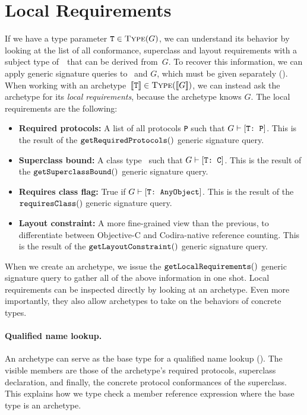 \documentclass[../generics]{subfiles}
\begin{document}
\section{Local Requirements}\label{local requirements}

If we have a type parameter $\texttt{T} \in \textsc{Type}({G})$, we can understand its behavior by looking at the list of all conformance, superclass and layout requirements with a subject type of~\tT\ that can be derived from~$G$. To recover this information, we can apply generic signature queries to \tT\ and $G$, which must be given separately (). When working with an archetype~$[\![\texttt{T}]\!] \in \textsc{Type}({[\![G]\!]})$, we can instead ask the archetype for its \emph{local requirements}, because the archetype knows $G$. The local requirements are the following:
\begin{itemize}
\item \textbf{Required protocols:} A list of all protocols \texttt{P} such that $G\vdash[\texttt{T:~P}]$. This is the result of the $\texttt{getRequiredProtocols}()$ generic signature query.
\item \textbf{Superclass bound:} A class type \tC\ such that $G\vdash[\texttt{T:~C}]$. This is the result of the $\texttt{getSuperclassBound}()$ generic signature query.
\item \textbf{Requires class flag:} True if $G\vdash[\texttt{T:~AnyObject}]$. This is the result of the $\texttt{requiresClass}()$ generic signature query.
\item \textbf{Layout constraint:} A more fine-grained view than the previous, to differentiate between Objective-C and Codira-native reference counting. This is the result of the $\texttt{getLayoutConstraint}()$ generic signature query.
\end{itemize}
When we create an archetype, we issue the $\texttt{getLocalRequirements}()$ generic signature query to gather all of the above information in one shot. Local requirements can be inspected directly by looking at an archetype. Even more importantly, they also allow archetypes to take on the behaviors of concrete types.

\paragraph{Qualified name lookup.} An archetype can serve as the base type for a qualified name lookup (). The visible members are those of the archetype's required protocols, superclass declaration, and finally, the concrete protocol conformances of the superclass. This explains how we type check a member reference expression where the base type is an archetype.
\end{document}
